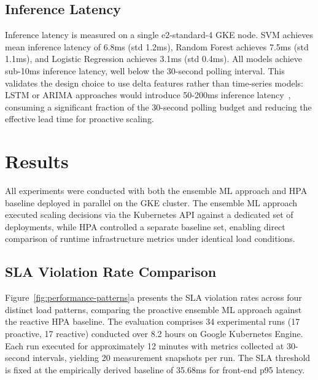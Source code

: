 \documentclass[conference]{IEEEtran}
\begin{document}
\subsection{Inference Latency}

Inference latency is measured on a single e2-standard-4 GKE node. SVM achieves mean inference latency of 6.8ms (std 1.2ms), Random Forest achieves 7.5ms (std 1.1ms), and Logistic Regression achieves 3.1ms (std 0.4ms). All models achieve sub-10ms inference latency, well below the 30-second polling interval. This validates the design choice to use delta features rather than time-series models: LSTM or ARIMA approaches would introduce 50-200ms inference latency~\cite{pbscaler}, consuming a significant fraction of the 30-second polling budget and reducing the effective lead time for proactive scaling.




\section{Results}

All experiments were conducted with both the ensemble ML approach and HPA baseline deployed in parallel on the GKE cluster. The ensemble ML approach executed scaling decisions via the Kubernetes API against a dedicated set of deployments, while HPA controlled a separate baseline set, enabling direct comparison of runtime infrastructure metrics under identical load conditions.

\subsection{SLA Violation Rate Comparison}

Figure~\ref{fig:performance-patterns}a presents the SLA violation rates across four distinct load patterns, comparing the proactive ensemble ML approach against the reactive HPA baseline. The evaluation comprises 34 experimental runs (17 proactive, 17 reactive) conducted over 8.2 hours on Google Kubernetes Engine. Each run executed for approximately 12 minutes with metrics collected at 30-second intervals, yielding 20 measurement snapshots per run. The SLA threshold is fixed at the empirically derived baseline of 35.68ms for front-end p95 latency.
\end{document}
